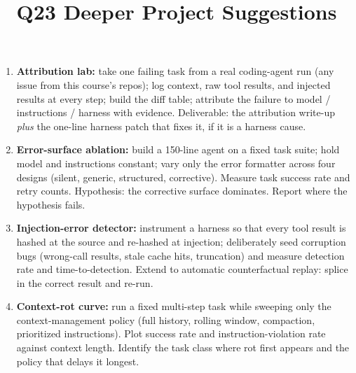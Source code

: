 \documentclass[11pt]{article}
\title{Q23 Deeper Project Suggestions}
\date{}
\begin{document}
\maketitle
\begin{enumerate}[noitemsep]
\item \textbf{Attribution lab:} take one failing task from a real coding-agent run (any issue from this course's repos); log context, raw tool results, and injected results at every step; build the diff table; attribute the failure to model / instructions / harness with evidence. Deliverable: the attribution write-up \emph{plus} the one-line harness patch that fixes it, if it is a harness cause.
\item \textbf{Error-surface ablation:} build a 150-line agent on a fixed task suite; hold model and instructions constant; vary only the error formatter across four designs (silent, generic, structured, corrective). Measure task success rate and retry counts. Hypothesis: the corrective surface dominates. Report where the hypothesis fails.
\item \textbf{Injection-error detector:} instrument a harness so that every tool result is hashed at the source and re-hashed at injection; deliberately seed corruption bugs (wrong-call results, stale cache hits, truncation) and measure detection rate and time-to-detection. Extend to automatic counterfactual replay: splice in the correct result and re-run.
\item \textbf{Context-rot curve:} run a fixed multi-step task while sweeping only the context-management policy (full history, rolling window, compaction, prioritized instructions). Plot success rate and instruction-violation rate against context length. Identify the task class where rot first appears and the policy that delays it longest.
\end{enumerate}
\end{document}
